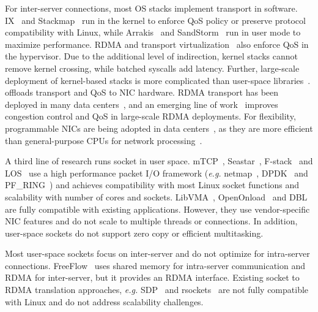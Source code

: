 For inter-server connections, most OS stacks implement transport in software. IX~\cite{belay2017ix} and Stackmap~\cite{yasukata2016stackmap} run in the kernel to enforce QoS policy or preserve protocol compatibility with Linux, while Arrakis~\cite{peter2016arrakis} and SandStorm~\cite{marinos2014network} run in user mode to maximize performance.
RDMA and transport virtualization~\cite{tsai2017lite,niu2017network} also enforce QoS in the hypervisor.
Due to the additional level of indirection, kernel stacks cannot remove kernel crossing, while batched syscalls add latency.
Further, large-scale deployment of kernel-based stacks is more complicated than user-space libraries~\cite{andromeda}.
\sys offloads transport and QoS to NIC hardware.
RDMA transport has been deployed in many data centers~\cite{guo2016rdma}, and an emerging line of work~\cite{zhu2015congestion,lu2017memory,mprdma} improves congestion control and QoS in large-scale RDMA deployments.
For flexibility, programmable NICs are being adopted in data centers~\cite{smartnic,cavium}, as they are more efficient than general-purpose CPUs for network processing~\cite{kaufmann2015flexnic,li2016clicknp}.



A third line of research runs socket in user space.
mTCP~\cite{jeong2014mtcp}, Seastar~\cite{seastar}, 
F-stack~\cite{fstack} and LOS~\cite{huang2017high} use a high performance packet I/O framework (\textit{e.g.} netmap~\cite{rizzo2012netmap}, DPDK~\cite{dpdk} and PF\_RING~\cite{pf-ring}) and achieves compatibility with most Linux socket functions and scalability with number of cores and sockets.
LibVMA~\cite{libvma}, OpenOnload~\cite{openonload} and DBL~\cite{dbl} are fully compatible with existing applications. However, they use vendor-specific NIC features and do not scale to multiple threads or connections.
In addition, user-space sockets do not support zero copy or efficient multitasking.

Most user-space sockets focus on inter-server and do not optimize for intra-server connections.
FreeFlow~\cite{freeflow} uses shared memory for intra-server communication and RDMA for inter-server, but it provides an RDMA interface.
Existing socket to RDMA translation approaches, \textit{e.g.} SDP~\cite{socketsdirect} and rsockets~\cite{rsockets} are not fully compatible with Linux and do not address scalability challenges.


\fi


